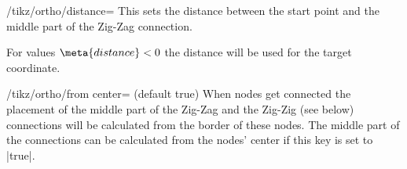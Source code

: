 \begin{key}{/tikz/ortho/distance=}
  This sets the distance between the start point
  and the middle part of the Zig-Zag connection.
  
  For values $\meta{distance} < 0$ the distance will be used for the target coordinate.
\begin{codeexample}[width=8cm,preamble=\usetikzlibrary{ext.paths.ortho}]
\end{codeexample}
\end{key}
\begin{key}{/tikz/ortho/from center= (default true)}
  When nodes get connected the placement of the middle part of the Zig-Zag
  and the Zig-Zig (see below) connections will be calculated from the border
  of these nodes.
  The middle part of the connections can be calculated from the nodes' center
  if this key is set to |true|.
\end{key}

